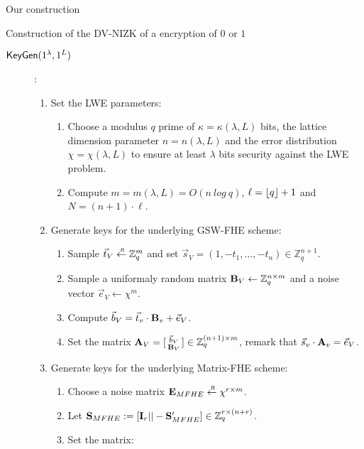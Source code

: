 \begin{section}{Our construction}
  \begin{subsection}{Construction of the DV-NIZK of a encryption of $0$ or $1$}
    
    \begin{description}
    \item[${\mathsf{KeyGen}}(1^\lambda, 1^L)$]:
      \begin{enumerate}
      \item Set the LWE parameters:
        \begin{enumerate}
        \item Choose a modulus $q$ prime of $\kappa = \kappa(\lambda, L)$ bits, the lattice dimension parameter $n = n(\lambda, L)$ and the error distribution $\chi = \chi(\lambda, L)$ to ensure at least $\lambda$ bits security against the LWE problem.
        \item Compute $m = m(\lambda, L) = O(n~log~q)$, $\ell = \lfloor q\rfloor+1$ and $N = (n+1) \cdot \ell$.
        \end{enumerate}
      \item Generate keys for the underlying GSW-FHE scheme:
        \begin{enumerate}
        \item Sample $\vec{t}_V \stackrel{{\scriptscriptstyle \mkern4mu R}}{\gets} \mathbb{Z}_q^m$ and set $\vec{s}_V = (1, -t_1, \dots, -t_n) \in \mathbb{Z}_q^{n+1}$.
        \item Sample a uniformaly random matrix $\mathbf{B}_V \gets \mathbb{Z}_q^{n \times m}$ and a noise vector $\vec{e}_V \gets \chi^m$.
        \item Compute $\vec{b}_V = \vec{t}_v \cdot \mathbf{B}_v  + \vec{e}_V$.
        \item Set the matrix $\mathbf{A}_V = [\begin{smallmatrix}\vec{b}_V \\ \mathbf{B}_V \end{smallmatrix}] \in \mathbb{Z}_q^{(n+1) \times m}$, remark that $\vec{s}_v \cdot \mathbf{A}_v = \vec{e}_V$.
        \end{enumerate}
      \item Generate keys for the underlying Matrix-FHE scheme:
        \begin{enumerate}
        \item Choose a noise matrix $\mathbf{E}_{MFHE} \stackrel{{\scriptscriptstyle \mkern4mu R}}{\gets} \chi^{r \times m}$.
        \item Let $\mathbf{S}_{MFHE}:= [\mathbf{I}_r || - \mathbf{S}_{MFHE}'] \in \mathbb{Z}_q^{r \times (n+r)}$.
        \item Set the matrix:

\end{enumerate}
\end{enumerate}
\end{description}
\end{subsection}
\end{section}
